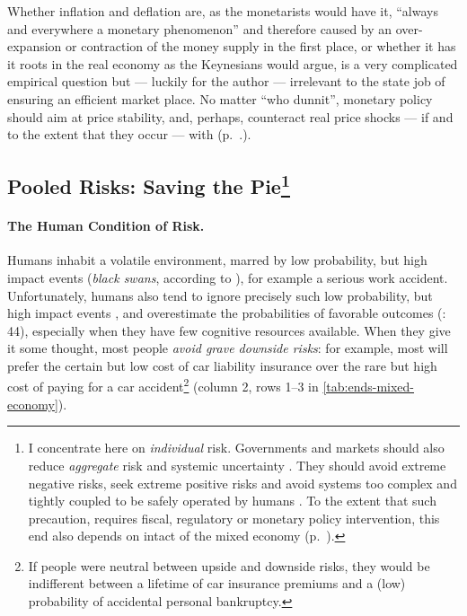 Whether inflation and deflation are, as the monetarists would have it, ``always and everywhere a monetary phenomenon'' \citep{Friedman1970} %
and therefore caused by an over-expansion or contraction of the money supply in the first place, or whether it has it roots in the real economy as the Keynesians would argue, is a very complicated empirical question but --- luckily for the author --- irrelevant to the state job of ensuring an efficient market place. No matter ``who dunnit'', monetary policy should aim at price stability, and, perhaps, counteract real price shocks --- if and to the extent that they occur --- with  (p.~\pageref{sec:monetary-stimulus}.).%

\subsection[Pooled Risks]{Pooled Risks: Saving the Pie\footnote{
	I concentrate here on \emph{individual} risk. Governments and markets should also reduce \emph{aggregate} risk and systemic uncertainty \citep{Knight1921}. They should avoid extreme negative risks, seek extreme positive risks \citep{Taleb2007} and avoid systems too complex and tightly coupled to be safely operated by humans \citep{Perrow-1999-aa}. To the extent that such precaution, requires fiscal, regulatory or monetary policy intervention, this end also depends on intact  of the mixed economy (p.~\pageref{sec:means}).}}
	\label{sec:risk}

\paragraph{The Human Condition of Risk.}  \label{sec:human-nature-of-risk} Humans inhabit a volatile environment, marred by low probability, but high impact events (\emph{black swans}, according to \citealt{Taleb2007}), for example a serious work accident. Unfortunately, humans also tend to ignore precisely such low probability, but high impact events \citep{Taleb2007}, and overestimate the probabilities of favorable outcomes (\citealt{Baron2000}: 44), especially when they have few cognitive resources available. 
When they give it some thought, most people \emph{avoid grave downside risks}: for example, most will prefer the certain but low cost of car liability insurance over the rare but high cost of paying for a car accident\footnote{
	If people were neutral between upside and downside risks, they would be indifferent between a lifetime of car insurance premiums and a (low) probability of accidental personal bankruptcy.} %
(column 2, rows 1--3 in \autoref{tab:ends-mixed-economy}).


